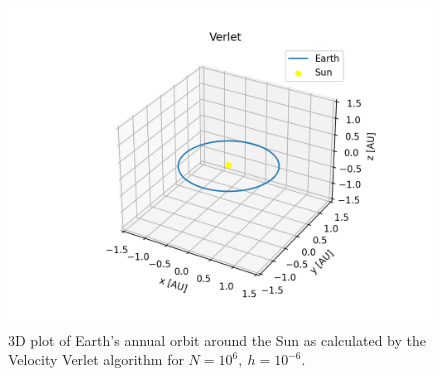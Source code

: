	\begin{figure}[h!]
		\centering
		\includegraphics[width=0.6\linewidth]{Figure/verlet_oneyear.png}
		\caption{3D plot of Earth's annual orbit around the Sun as calculated by the Velocity Verlet algorithm for $N = 10^6,\ h = 10^{-6}$.}
		\label{verlet3doneyear}
	\end{figure}
	\newpage

